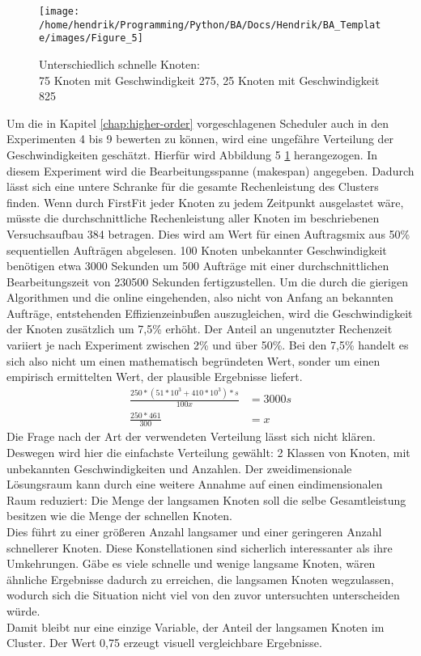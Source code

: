 \begin{figure}
	\centering
	\texttt{[image: /home/hendrik/Programming/Python/BA/Docs/Hendrik/BA\_Template/images/Figure\_5]}
	\caption{Unterschiedlich schnelle Knoten:\\
	75 Knoten mit Geschwindigkeit 275, 25 Knoten mit Geschwindigkeit 825}
	\label{figure5}
\end{figure}

Um die in Kapitel \ref{chap:higher-order} vorgeschlagenen Scheduler auch in den Experimenten 4 bis 9 bewerten zu können, wird eine ungefähre Verteilung der Geschwindigkeiten geschätzt.
Hierfür wird Abbildung 5 \ref{figure5} herangezogen. In diesem Experiment wird die Bearbeitungsspanne (makespan) angegeben. Dadurch lässt sich eine untere Schranke für die gesamte Rechenleistung des Clusters finden. Wenn durch FirstFit jeder Knoten zu jedem Zeitpunkt ausgelastet wäre, müsste die durchschnittliche Rechenleistung aller Knoten im beschriebenen Versuchsaufbau 384 betragen. Dies wird am Wert für einen Auftragsmix aus 50\% sequentiellen Aufträgen abgelesen. 100 Knoten unbekannter Geschwindigkeit benötigen etwa 3000 Sekunden um 500 Aufträge mit einer durchschnittlichen Bearbeitungszeit von 230500 Sekunden fertigzustellen. Um die durch die gierigen Algorithmen und die online eingehenden, also nicht von Anfang an bekannten Aufträge, entstehenden Effizienzeinbußen auszugleichen, wird die Geschwindigkeit der Knoten zusätzlich um 7,5\% erhöht. Der Anteil an ungenutzter Rechenzeit variiert je nach Experiment zwischen 2\% und über 50\%. Bei den 7,5\% handelt es sich also nicht um einen mathematisch begründeten Wert, sonder um einen empirisch ermittelten Wert, der plausible Ergebnisse liefert.
\begin{align*}
\frac{250*(51* 10^3 + 410*10^3)*s}{100x} &= 3000s \\
\frac{250*461}{300} &= x
\end{align*}
Die Frage nach der Art der verwendeten Verteilung lässt sich nicht klären. Deswegen wird hier die einfachste Verteilung gewählt: 2 Klassen von Knoten, mit unbekannten Geschwindigkeiten und Anzahlen. Der zweidimensionale Lösungsraum kann durch eine weitere Annahme auf einen eindimensionalen Raum reduziert: Die Menge der langsamen Knoten soll die selbe Gesamtleistung besitzen wie die Menge der schnellen Knoten.\\
Dies führt zu einer größeren Anzahl langsamer und einer geringeren Anzahl schnellerer Knoten. Diese Konstellationen sind sicherlich interessanter als ihre Umkehrungen. Gäbe es viele schnelle und wenige langsame Knoten, wären ähnliche Ergebnisse dadurch zu erreichen, die langsamen Knoten wegzulassen, wodurch sich die Situation nicht viel von den zuvor untersuchten unterscheiden würde.\\
Damit bleibt nur eine einzige Variable, der Anteil der langsamen Knoten im Cluster. Der Wert 0,75 erzeugt visuell vergleichbare Ergebnisse.


